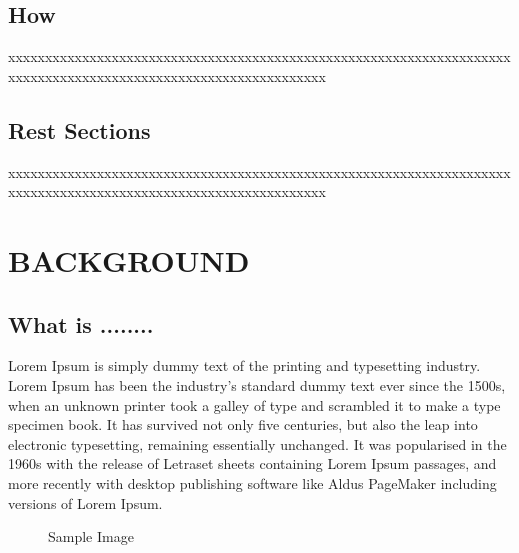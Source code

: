 \documentclass[12pt,a4paper]{report}
\begin{document}
\begin{CJK*}{UTF8}{bkai}
    \section{How}
    xxxxxxxxxxxxxxxxxxxxxxxxxxxxxxxxxxxxxxxxxxxxxxxxxxxxxxxxxxxxxxxxxxxxxxxxxxxxxxxxxxxxxxxxxxxxxxxxxxxxxxxxxxxxxxx

    \section{Rest Sections}
    xxxxxxxxxxxxxxxxxxxxxxxxxxxxxxxxxxxxxxxxxxxxxxxxxxxxxxxxxxxxxxxxxxxxxxxxxxxxxxxxxxxxxxxxxxxxxxxxxxxxxxxxxxxxxxx

    \chapter{BACKGROUND}
    \section{What is ........}
    Lorem Ipsum is simply dummy text of the printing and typesetting industry. Lorem Ipsum has been the industry's standard dummy text ever since the 1500s, when an unknown printer took a galley of type and scrambled it to make a type specimen book. It has survived not only five centuries, but also the leap into electronic typesetting, remaining essentially unchanged. It was popularised in the 1960s with the release of Letraset sheets containing Lorem Ipsum passages, and more recently with desktop publishing software like Aldus PageMaker including versions of Lorem Ipsum.
    \begin{figure}[H]
        \centering
        \caption{Sample Image}
        \label{fig:sample image}
    \end{figure}

    \begin{table}[htbp]
        \caption{Sample Table}
        \vspace{0.5cm}
    \end{table}



\end{CJK*}
\end{document}
